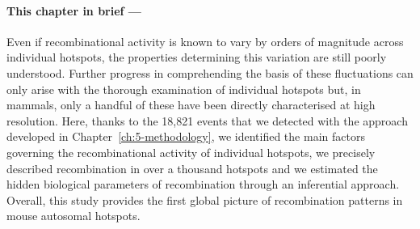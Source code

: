 {\small{} \itshape{}

\paragraph{This chapter in brief —}

Even if recombinational activity is known to vary by orders of magnitude across individual hotspots, the properties determining this variation are still poorly understood.
Further progress in comprehending the basis of these fluctuations can only arise with the thorough examination of individual hotspots but, in mammals, only a handful of these have been directly characterised at high resolution.
Here, thanks to the 18,821 events that we detected with the approach developed in Chapter~\ref{ch:5-methodology}, we identified the main factors governing the recombinational activity of individual hotspots, we precisely described recombination in over a thousand hotspots and we estimated the hidden biological parameters of recombination through an inferential approach.
Overall, this study provides the first global picture of recombination patterns in mouse autosomal hotspots.


}

